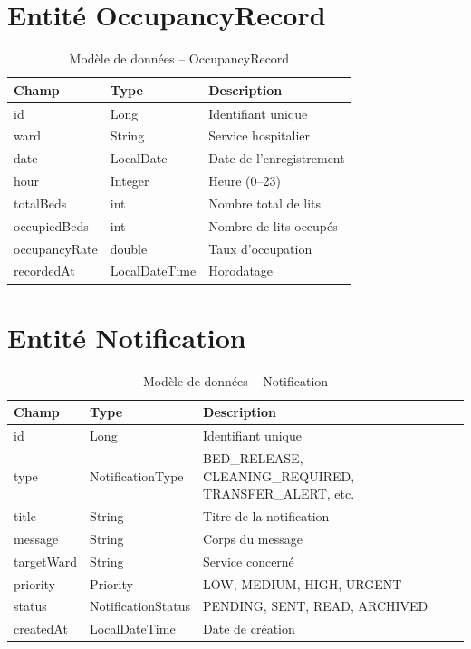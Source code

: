 \documentclass[12pt,a4paper]{report}
\begin{document}
\section{Entit\'e OccupancyRecord}

\begin{table}[H]
    \centering
    \begin{tabularx}{\textwidth}{llX}
        \toprule
        \textbf{Champ} & \textbf{Type} & \textbf{Description} \\
        \midrule
        id & Long & Identifiant unique \\
        ward & String & Service hospitalier \\
        date & LocalDate & Date de l'enregistrement \\
        hour & Integer & Heure (0--23) \\
        totalBeds & int & Nombre total de lits \\
        occupiedBeds & int & Nombre de lits occup\'es \\
        occupancyRate & double & Taux d'occupation \\
        recordedAt & LocalDateTime & Horodatage \\
        \bottomrule
    \end{tabularx}
    \caption{Mod\`ele de donn\'ees -- OccupancyRecord}
\end{table}

\section{Entit\'e Notification}

\begin{table}[H]
    \centering
    \begin{tabularx}{\textwidth}{llX}
        \toprule
        \textbf{Champ} & \textbf{Type} & \textbf{Description} \\
        \midrule
        id & Long & Identifiant unique \\
        type & NotificationType & BED\_RELEASE, CLEANING\_REQUIRED, TRANSFER\_ALERT, etc. \\
        title & String & Titre de la notification \\
        message & String & Corps du message \\
        targetWard & String & Service concern\'e \\
        priority & Priority & LOW, MEDIUM, HIGH, URGENT \\
        status & NotificationStatus & PENDING, SENT, READ, ARCHIVED \\
        createdAt & LocalDateTime & Date de cr\'eation \\
        \bottomrule
    \end{tabularx}
    \caption{Mod\`ele de donn\'ees -- Notification}
\end{table}
\end{document}
